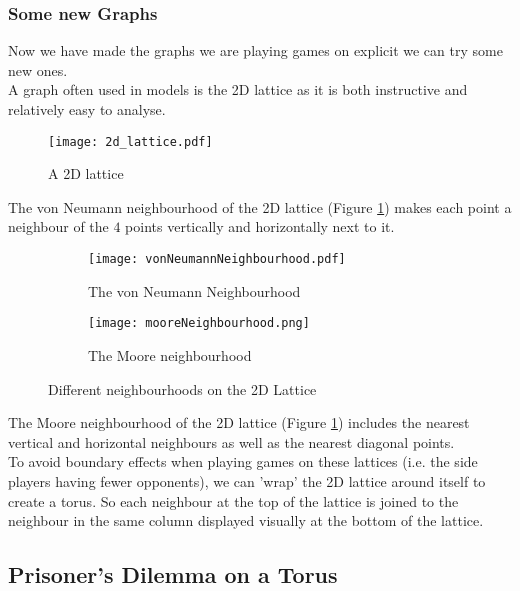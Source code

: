 \subsubsection{Some new Graphs}
Now we have made the graphs we are playing games on explicit we can try some new ones.\\
A graph often used in models is the 2D lattice as it is both instructive and relatively easy to analyse.\cite{eq_of_life}\\
\begin{figure}
	\centering
	\texttt{[image: 2d\_lattice.pdf]}
	\caption{A 2D lattice}
\end{figure}
The von Neumann neighbourhood of the 2D lattice (Figure \ref{fig:vonneumann}) makes each point a neighbour of the $4$ points vertically and horizontally next to it.\\
\begin{figure}
	\centering
	\begin{subfigure}{.5\textwidth}
		\centering
		\texttt{[image: vonNeumannNeighbourhood.pdf]}
		\caption{The von Neumann Neighbourhood}
		\label{fig:vonneumann}
	\end{subfigure}%
	\begin{subfigure}{.5\textwidth}
		\centering
		\texttt{[image: mooreNeighbourhood.png]}
		\caption{The Moore neighbourhood}
		\label{fig:moore}
	\end{subfigure}
	\caption{Different neighbourhoods on the 2D Lattice}
	\label{fig: lattice neighbourhoods}
\end{figure}
The Moore neighbourhood of the 2D lattice (Figure \ref{fig:vonneumann}) includes the nearest vertical and horizontal neighbours as well as the nearest diagonal points.\\
To avoid boundary effects when playing games on these lattices (i.e. the side players having fewer opponents), we can 'wrap' the 2D lattice around itself to create a torus. So each neighbour at the top of the lattice is joined to the neighbour in the same column displayed visually at the bottom of the lattice.
\subsection{Prisoner's Dilemma on a Torus}
